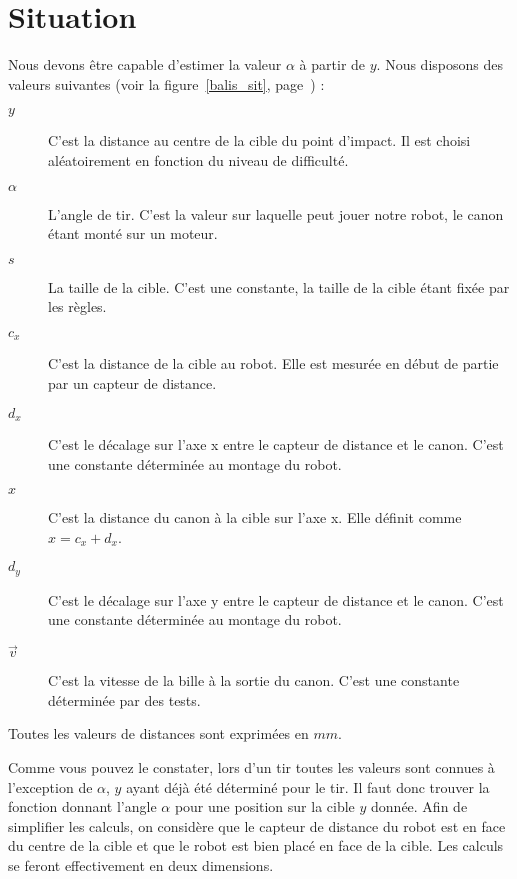 \section{Situation}
Nous devons être capable d'estimer la valeur $\alpha$ à partir de $y$. Nous disposons des valeurs suivantes (voir la figure~\ref{balis_sit}, page~\pageref{balis_sit}) :
\begin{description}
	\item[$y$] C'est la distance au centre de la cible du point d'impact. Il est choisi aléatoirement en fonction du niveau de difficulté.
	\item[$\alpha$] L'angle de tir. C'est la valeur sur laquelle peut jouer notre robot, le canon étant monté sur un moteur.
	\item[$s$] La taille de la cible. C'est une constante, la taille de la cible étant fixée par les règles.
	\item[$c_x$] C'est la distance de la cible au robot. Elle est mesurée en début de partie par un capteur de distance.
	\item[$d_x$] C'est le décalage sur l'axe x entre le capteur de distance et le canon. C'est une constante déterminée au montage du robot.
	\item[$x$] C'est la distance du canon à la cible sur l'axe x. Elle définit comme $x=c_x+d_x$.
	\item[$d_y$] C'est le décalage sur l'axe y entre le capteur de distance et le canon. C'est une constante déterminée au montage du robot.
	\item[$\overrightarrow{v}$] C'est la vitesse de la bille à la sortie du canon. C'est une constante déterminée par des tests.
\end{description}
Toutes les valeurs de distances sont exprimées en $mm$.

Comme vous pouvez le constater, lors d'un tir toutes les valeurs sont connues à l'exception de $\alpha$, $y$ ayant déjà été déterminé pour le tir. Il faut donc trouver la fonction donnant l'angle $\alpha$ pour une position sur la cible $y$ donnée. Afin de simplifier les calculs, on considère que le capteur de distance du robot est en face du centre de la cible et que le robot est bien placé en face de la cible. Les calculs se feront effectivement en deux dimensions.

